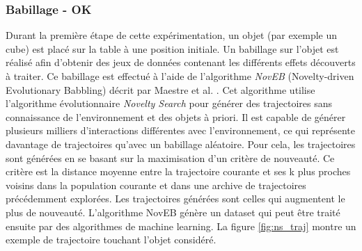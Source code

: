 \documentclass[draft]{llncs}
\begin{document}
\subsubsection{Babillage - OK}
Durant la première étape de cette expérimentation, un objet (par exemple un cube) est placé sur la table à une position initiale.
Un babillage sur l'objet est réalisé afin d'obtenir des jeux de données contenant les différents effets découverts à traiter.
Ce babillage est effectué à l'aide de l'algorithme \textit{NovEB} (Novelty-driven Evolutionary Babbling) décrit par Maestre et al. \cite{Maestre2015}.
Cet algorithme utilise l'algorithme évolutionnaire \textit{Novelty Search} \cite{5949955} pour générer des trajectoires sans connaissance de l'environnement et des objets à priori. 
Il est capable de générer plusieurs milliers d'interactions différentes avec l'environnement, ce qui représente davantage de trajectoires qu'avec un babillage aléatoire.
Pour cela, les trajectoires sont générées en se basant sur la maximisation d'un critère de nouveauté.
Ce critère est la distance moyenne entre la trajectoire courante et ses k plus proches voisins dans la population courante et dans une archive de trajectoires précédemment explorées.
Les trajectoires générées sont celles qui augmentent le plus de nouveauté.
L'algorithme NovEB génère un dataset qui peut être traité ensuite par des algorithmes de machine learning.
La figure \ref{fig:ns_traj} montre un exemple de trajectoire touchant l'objet considéré.

\end{document}
